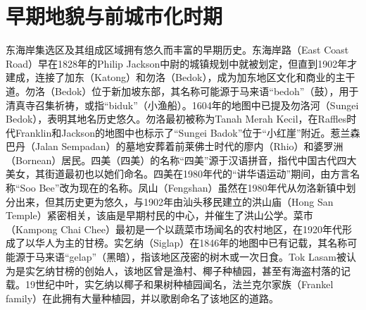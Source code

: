\documentclass[11pt,a4paper,twoside,openany]{book}
\begin{document}
\section{早期地貌与前城市化时期}
东海岸集选区及其组成区域拥有悠久而丰富的早期历史。东海岸路（East Coast Road）早在1828年的Philip Jackson中尉的城镇规划中就被划定，但直到1902年才建成，连接了加东（Katong）和勿洛（Bedok），成为加东地区文化和商业的主干道。勿洛（Bedok）位于新加坡东部，其名称可能源于马来语“bedoh”（鼓），用于清真寺召集祈祷，或指“biduk”（小渔船）。1604年的地图中已提及勿洛河（Sungei Bedok），表明其地名历史悠久。勿洛最初被称为Tanah Merah Kecil，在Raffles时代Franklin和Jackson的地图中也标示了“Sungei Badok”位于“小红崖”附近。惹兰森巴丹（Jalan Sempadan）的墓地安葬着前莱佛士时代的廖内（Rhio）和婆罗洲（Bornean）居民。四美（四美）的名称“四美”源于汉语拼音，指代中国古代四大美女，其街道最初也以她们命名。四美在1980年代的“讲华语运动”期间，由方言名称“Soo Bee”改为现在的名称。凤山（Fengshan）虽然在1980年代从勿洛新镇中划分出来，但其历史更为悠久，与1902年由汕头移民建立的洪山庙（Hong San Temple）紧密相关，该庙是早期村民的中心，并催生了洪山公学。菜市（Kampong Chai Chee）最初是一个以蔬菜市场闻名的农村地区，在1920年代形成了以华人为主的甘榜。实乞纳（Siglap）在1846年的地图中已有记载，其名称可能源于马来语“gelap”（黑暗），指该地区茂密的树木或一次日食。Tok Lasam被认为是实乞纳甘榜的创始人，该地区曾是渔村、椰子种植园，甚至有海盗村落的记载。19世纪中叶，实乞纳以椰子和果树种植园闻名，法兰克尔家族（Frankel family）在此拥有大量种植园，并以歌剧命名了该地区的道路。
\end{document}
